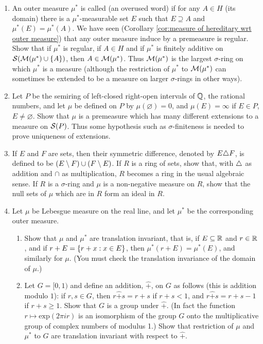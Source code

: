 \begin{enumerate}[label=\arabic*),ref=\arabic*]
\item An outer measure $\mu^*$ is called  (an overused word) if for any $A\in H$ (its domain) there is a $\mu^*$-measurable set $E$ such that $E\supseteq A$ and $\mu^*(E)=\mu^*(A)$. We have seen (Corollary \ref{cor:measure of hereditary wrt outer measure}) that any outer measure induce by a premeasure is regular. Show that if $\mu^*$ is regular, if $A\in H$ and if $\mu^*$ is finitely additive on ${\cal S}({\cal M}(\mu^*)\cup\left\{A\right\})$, then $A\in{\cal M}(\mu^*)$. Thus ${\cal M}(\mu^*)$ is the largest $\sigma$-ring on which $\mu^*$ is a measure (although the restriction of $\mu^*$ to ${\cal M}(\mu^*)$ can sometimes be extended to be a measure on larger $\sigma$-rings in other ways).

\item\label{exer:non unique extension measure} Let $P$ be the semiring of left-closed right-open intervals of $\mathbb{Q}$, the rational numbers, and let $\mu$ be defined on $P$ by $\mu(\varnothing)=0$, and $\mu(E)=\infty$ if $E\in P$, $E\neq\varnothing$. Show that $\mu$ is a premeasure which has many different extensions to a measure on ${\cal S}(P)$. Thus some hypothesis such as $\sigma$-finiteness is needed to prove uniqueness of extensions.

\item\label{exer:null set as ideal}
If $E$ and $F$ are sets, then their symmetric difference, denoted by $E\triangle F$, is defined to be $(E\setminus F)\cup(F\setminus E)$. If $R$ is a ring of sets, show that, with $\triangle$ as addition and $\cap$ as multiplication, $R$ becomes a ring in the usual algebraic sense. If $R$ is a $\sigma$-ring and $\mu$ is a non-negative measure on $R$, show that the null sets of $\mu$ which are in $R$ form an ideal in $R$.

\item\label{exer:lebesgue measure rotation inv}
Let $\mu$ be Lebesgue measure on the real line, and let $\mu^*$ be the corresponding outer measure.
\begin{enumerate}[label=\alph*),ref=\theenumi\alph*)]
    \item\label{exer:item:translation inv}
    Show that $\mu$ and $\mu^*$ are translation invariant, that is, if $E\subseteq\mathbb{R}$ and $r\in\mathbb{R}$, and if $r+E=\left\{r+x:x\in E\right\}$, then $\mu^*(r+E)=\mu^*(E)$, and similarly for $\mu$. (You must check the translation invariance of the domain of $\mu$.)
    
    \item Let $G=[0,1)$ and define an addition, $\widehat{+}$, on $G$ as follows (this is addition modulo $1$): if $r,s\in G$, then $r\widehat{+}s=r+s$ if $r+s<1$, and $r\widehat{+}s=r+s-1$ if $r+s\geq1$. Show that $G$ is a group under $\widehat{+}$. (In fact the function $r\mapsto\text{exp}(2\pi ir)$ is an isomorphism of the group $G$ onto the multiplicative group of complex numbers of modulus 1.) Show that restriction of $\mu$ and $\mu^*$ to $G$ are translation invariant with respect to $\widehat{+}$.
    

\end{enumerate}
\end{enumerate}
